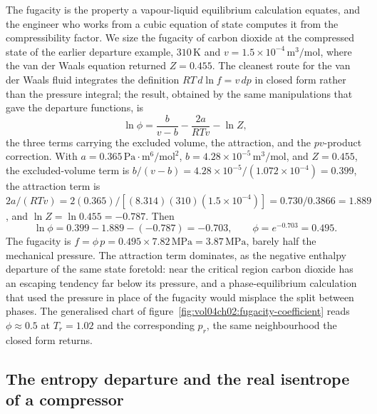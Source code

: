 The fugacity is the property a vapour-liquid equilibrium calculation
equates, and the engineer who works from a cubic equation of state computes
it from the compressibility factor. We size the fugacity of carbon dioxide
at the compressed state of the earlier departure example, $310\,\si{\kelvin}$
and $v = 1.5\times 10^{-4}\,\text{m}^3/\text{mol}$, where the van der Waals
equation returned $Z = 0.455$. The cleanest route for the van der Waals
fluid integrates the definition $RT\,d\ln f = v\,dp$ in closed form rather
than the pressure integral; the result, obtained by the same manipulations
that gave the departure functions, is
\[
\ln\phi = \frac{b}{v-b} - \frac{2a}{RTv} - \ln Z,
\]
the three terms carrying the excluded volume, the attraction, and the
$pv$-product correction. With $a = 0.365\,\text{Pa}\cdot\text{m}^6/
\text{mol}^2$, $b = 4.28\times 10^{-5}\,\text{m}^3/\text{mol}$, and $Z =
0.455$, the excluded-volume term is $b/(v-b) = 4.28\times 10^{-5}/
(1.072\times 10^{-4}) = 0.399$, the attraction term is $2a/(RTv) =
2(0.365)/[(8.314)(310)(1.5\times 10^{-4})] = 0.730/0.3866 = 1.889$, and
$\ln Z = \ln 0.455 = -0.787$. Then
\[
\ln\phi = 0.399 - 1.889 - (-0.787) = -0.703, \qquad \phi = e^{-0.703} =
0.495.
\]
The fugacity is $f = \phi\, p = 0.495\times 7.82\,\text{MPa} = 3.87\,
\text{MPa}$, barely half the mechanical pressure. The attraction term
dominates, as the negative enthalpy departure of the same state foretold:
near the critical region carbon dioxide has an escaping tendency far below
its pressure, and a phase-equilibrium calculation that used the pressure in
place of the fugacity would misplace the split between phases. The
generalised chart of figure~\ref{fig:vol04ch02:fugacity-coefficient} reads
$\phi \approx 0.5$ at $T_r = 1.02$ and the corresponding $p_r$, the same
neighbourhood the closed form returns.

\subsection{The entropy departure and the real isentrope of a compressor}

